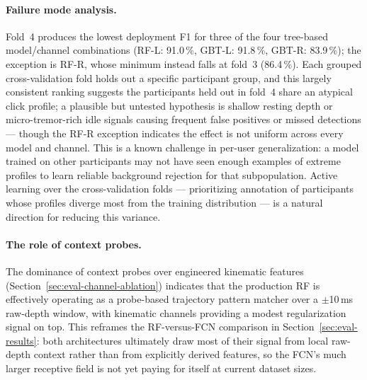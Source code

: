 \paragraph{Failure mode analysis.}
Fold~4 produces the lowest deployment F1 for three of the four tree-based
model/channel combinations (RF-L: 91.0\,\%, GBT-L: 91.8\,\%, GBT-R: 83.9\,\%); the
exception is RF-R, whose minimum instead falls at fold~3 (86.4\,\%).  Each grouped
cross-validation fold holds out a specific participant group, and this largely
consistent ranking suggests the participants held out in fold~4 share an atypical
click profile; a plausible but untested hypothesis is shallow resting depth or
micro-tremor-rich idle signals causing frequent false positives or missed
detections --- though the RF-R exception indicates the effect is not uniform
across every model and channel.
This is a known challenge in per-user generalization: a model trained
on other participants may not have seen enough examples of extreme profiles to learn
reliable background rejection for that subpopulation.  Active learning over the
cross-validation folds --- prioritizing annotation of participants whose profiles
diverge most from the training distribution --- is a natural direction for reducing
this variance.

\paragraph{The role of context probes.}
The dominance of context probes over engineered kinematic features
(Section~\ref{sec:eval-channel-ablation}) indicates that the production RF is
effectively operating as a probe-based trajectory pattern matcher over a
$\pm$10\,ms raw-depth window, with kinematic channels providing a modest
regularization signal on top.  This reframes the RF-versus-FCN comparison in
Section~\ref{sec:eval-results}: both architectures ultimately draw most of their
signal from local raw-depth context rather than from explicitly derived
features, so the FCN's much larger receptive field is not yet paying for itself
at current dataset sizes.

